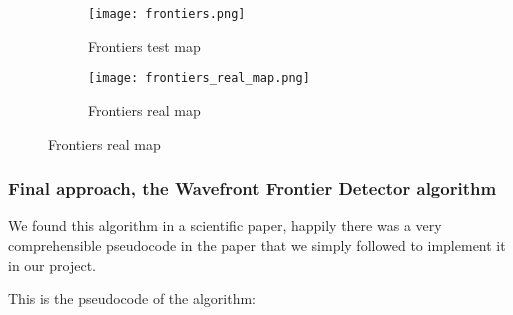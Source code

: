 \begin{figure}[h]
    \centering
    \begin{subfigure}{.5\textwidth}
        \centering
        \texttt{[image: frontiers.png]}
        \caption{Frontiers test map}
        \label{fig:frontiers}
    \end{subfigure}%
    \begin{subfigure}{.5\textwidth}
        \centering
        \texttt{[image: frontiers\_real\_map.png]}
        \caption{Frontiers real map}
        \label{fig:frontiers_real_map}
    \end{subfigure}
\end{figure}

\subsubsection{Final approach, the Wavefront Frontier Detector algorithm}

We found this algorithm in a scientific paper, happily there was a very comprehensible pseudocode in the paper that we simply followed to implement it in our project.

This is the pseudocode of the algorithm:

